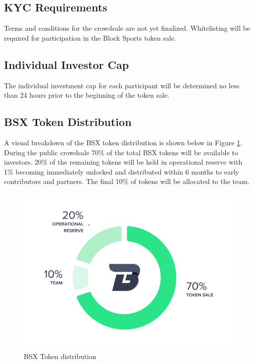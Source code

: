 \documentclass{article}
\begin{document}
	\subsection{KYC Requirements} \label{kyc-requirements}
Terms and conditions for the crowdsale are not yet finalized. Whitelisting will be required for participation in the Block Sports token sale.

	\subsection{Individual Investor Cap} \label{individual-investor-cap}
The individual investment cap for each participant will be determined no less than 24 hours prior to the beginning of the token sale.

	\subsection{BSX Token Distribution} \label{bsx-token-distribution}
A visual breakdown of the BSX token distribution is shown below in Figure \ref{figure:distribution}. During the public crowdsale 70\% of the total BSX tokens will be available to investors. 20\% of the remaining tokens will be held in operational reserve with 1\% becoming immediately unlocked and distributed within 6 months to early contributors and partners. The final 10\% of tokens will be allocated to the team.

\begin{figure}[!htb]
\centering
\includegraphics[scale=.2]{./images/tokensale-diagram.png}
\caption{BSX Token distribution}
\label{figure:distribution}
\end{figure}
\end{document}

